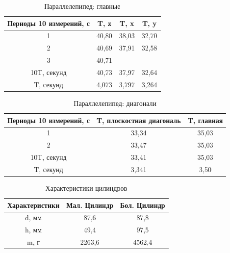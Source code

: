 \begin{table}[!h!]
   \centering
   \caption{Параллелепипед: главные}
   \begin{tabular}{|c|c|c|c|}
   \hline
       Периоды 10 измерений, с & T, z& T, x& T, y \\ \hline
       1 & 40,80 & 38,03 & 32,70  \\ \hline
       2 & 40,69 & 37,91 & 32,58  \\ \hline
       3 & 40,71 & ~ &   \\ \hline
       10T, секунд & 40,73 & 37,97 & 32,64  \\ \hline
       T, секунд & 4,073 & 3,797 & 3,264  \\ \hline
   \end{tabular}
\end{table}
\begin{table}[ht!]
   \centering
   \caption{Параллелепипед: диагонали}
   \begin{tabular}{|c|c|c|}
   \hline
       Периоды 10 измерений, с & T, плоскостная диагональ & T, главная  \\ \hline
       1 & 33,34 & 35,03  \\ \hline
       2 & 33,47 & 35,03  \\ \hline
       10T, секунд & 33,41 & 35,03  \\ \hline
       T, секунд & 3,341 & 3,50  \\ \hline
   \end{tabular}
\end{table}

\begin{table}[!h!]
   \centering
   \caption{Характеристики цилиндров}
   \begin{tabular}{|c|c|c|}
   \hline
       Характеристики & Мал. Цилиндр & Бол. Цилиндр \\ \hline
       d, мм & 87,6 & 87,8 \\ \hline
       h, мм & 49,4 & 97,5 \\ \hline
       m, г & 2263,6 & 4562,4 \\ \hline
   \end{tabular}
\end{table}


